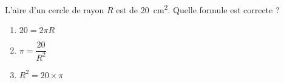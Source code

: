 
\begin{mental}
L'aire d'un cercle de rayon \( R\) est de \SI{20}{\centi\meter\squared}. Quelle formule est correcte ?
\begin{enumerate}
    \item
        \( 20=2\pi R\)
    \item
        \( \pi=\dfrac{ 20 }{ R^2 }\)
    \item
        \( R^2=20\times \pi\)
\end{enumerate}
\end{mental}
